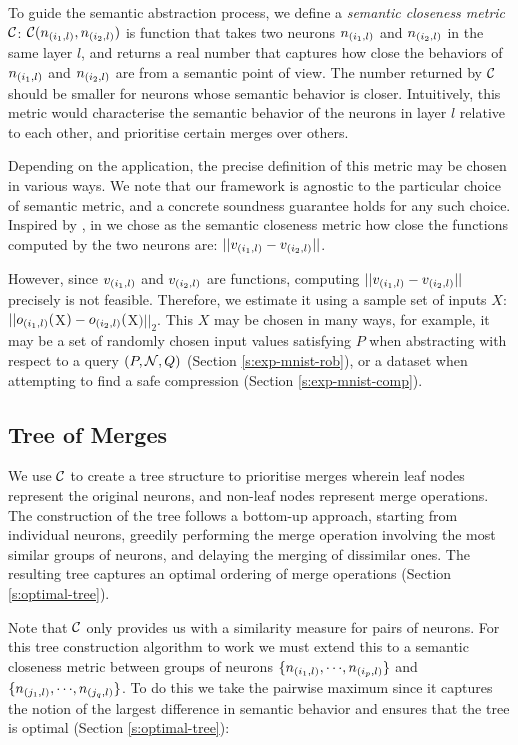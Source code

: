 
To guide the semantic abstraction process, we define a \textit{semantic
closeness metric} $\mathcal{C}$: $\mathcal{C}(n_{(i_1,l)}, n_{(i_2,l)})$ is function that
takes two neurons $n_{(i_1,l)}$ and $n_{(i_2,l)}$ in
the same layer $l$, and returns a real number that
captures how close the behaviors of $n_{(i_1,l)}$ and $n_{(i_2,l)}$ are from a
semantic point of view. The number returned by $\mathcal{C}$ should be smaller for
neurons whose semantic behavior is closer. Intuitively, this metric would
characterise the semantic behavior of the
neurons in layer $l$ relative to each other, and prioritise certain merges over
others. 

Depending on the application, the precise definition of this metric may be
chosen in various ways. We note that our framework is agnostic to the particular
choice of semantic metric, and a concrete soundness guarantee holds for any such
choice. Inspired by \cite{deep-abstract}, in we chose as the
semantic closeness metric how close the functions computed by the two neurons
are: $||v_{(i_1,l)} - v_{(i_2,l)}||$. 

However, since $v_{(i_1,l)}$ and $v_{(i_2,l)}$ are functions, computing
$||v_{(i_1,l)} - v_{(i_2,l)}||$ precisely is not feasible.
Therefore, we estimate it using a sample set of inputs $X$: $||o_{(i_1,l)}($X$)
- o_{(i_2,l)}($X$)||_2$. This $X$ may be chosen in many ways, for example, it
may be a set of randomly chosen input values satisfying $P$ when
abstracting with respect to a query $(P, \mathcal{N}, Q)$
(Section \ref{s:exp-mnist-rob}), or a dataset when attempting to find a
safe compression (Section \ref{s:exp-mnist-comp}).

\subsection{Tree of Merges}
\label{s:tree}

We use $\mathcal{C}$ to create a tree structure to prioritise merges wherein leaf nodes
represent the original neurons, and 
non-leaf nodes represent merge operations. The construction of the tree 
follows a bottom-up approach, starting from individual neurons, 
greedily performing the merge operation involving the most similar groups of
neurons, and delaying the merging of dissimilar ones. The resulting tree
captures an optimal ordering of merge operations (Section \ref{s:optimal-tree}).

Note that $\mathcal{C}$ only provides us
with a similarity measure for pairs of neurons. For this tree construction
algorithm to work we must extend this to a semantic closeness
metric between groups of neurons
$\{n_{(i_1,l)}, {\cdots}, n_{(i_p,l)}\}$ and $\{n_{(j_1,l)}, {\cdots},
n_{(j_q,l)}\}$. To do this we take the pairwise maximum since it captures the
notion of the largest difference in semantic behavior and ensures that the tree
is optimal (Section \ref{s:optimal-tree}): 

